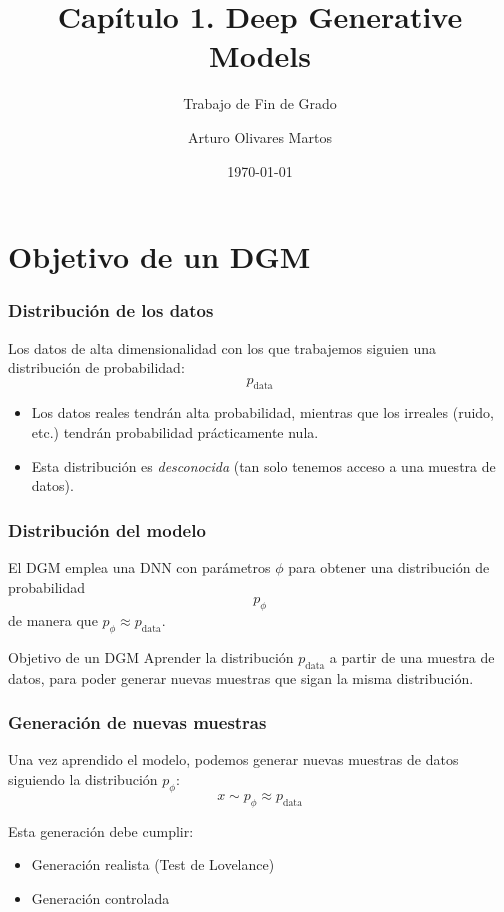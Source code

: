 \documentclass{beamer}
\title[1. DGM]{Capítulo 1. Deep Generative Models}
\subtitle{Trabajo de Fin de Grado}
\author[Arturo]{Arturo Olivares Martos}
\institute[DGIIM - UGR]{Doble Grado en Ingeniería Informática y Matemáticas\\Universidad de Granada}
\date{\today}
\begin{document}
\begin{frame}
    \titlepage
\end{frame}

\section{Objetivo de un DGM}
\begin{frame}
	\frametitle{Distribución de los datos}

	Los datos de alta dimensionalidad con los que trabajemos siguien una distribución de probabilidad:
	\begin{equation*}
		p_{\text{data}}
	\end{equation*}\pause

	\begin{itemize}
		\item Los datos reales tendrán alta probabilidad, mientras que los irreales (ruido, etc.) tendrán probabilidad prácticamente nula.
		\pause
		\item Esta distribución es \emph{desconocida} (tan solo tenemos acceso a una muestra de datos).
	\end{itemize}
\end{frame}

\begin{frame}
	\frametitle{Distribución del modelo}
	
	El DGM emplea una DNN con parámetros $\phi$ para obtener una distribución de probabilidad
	\begin{equation*}
		p_{\phi}
	\end{equation*}
	de manera que $p_{\phi} \approx p_{\text{data}}$.\pause
	\begin{alertblock}{Objetivo de un DGM}
		Aprender la distribución $p_{\text{data}}$ a partir de una muestra de datos, para poder generar nuevas muestras que sigan la misma distribución.
	\end{alertblock}
\end{frame}

\begin{frame}
	\frametitle{Generación de nuevas muestras}
	
	Una vez aprendido el modelo, podemos generar nuevas muestras de datos siguiendo la distribución $p_{\phi}$:
	\begin{equation*}
		x \sim p_{\phi} \approx p_{\text{data}}
	\end{equation*}
	
	\pause
	Esta generación debe cumplir:\pause
	\begin{itemize}
		\item Generación realista (Test de Lovelance)\pause
		\item Generación controlada
	\end{itemize}
\end{frame}
\end{document}

